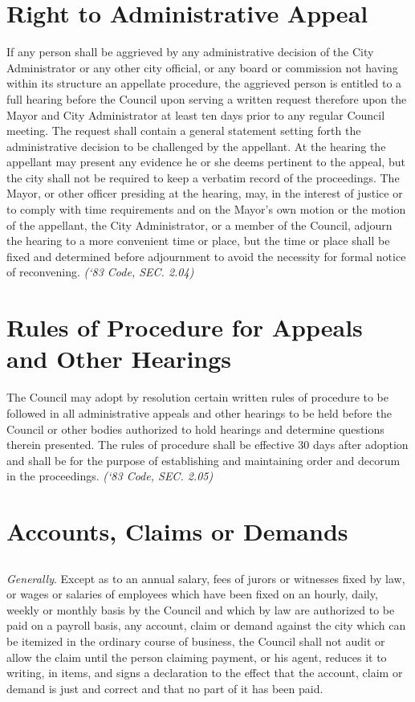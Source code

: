 \section{Right to Administrative Appeal}
If any person shall be aggrieved by any administrative decision of the City Administrator or any other city official, or any board or commission not having within its structure an appellate procedure, the aggrieved person is entitled to a full hearing before the Council upon serving a written request therefore upon the Mayor and City Administrator at least ten days prior to any regular Council meeting. The request shall contain a general statement setting forth the administrative decision to be challenged by the appellant. At the hearing the appellant may present any evidence he or she deems pertinent to the appeal, but the city shall not be required to keep a verbatim record of the proceedings. The Mayor, or other officer presiding at the hearing, may, in the interest of justice or to comply with time requirements and on the Mayor’s own motion or the motion of the appellant, the City Administrator, or a member of the Council, adjourn the hearing to a more convenient time or place, but the time or place shall be fixed and determined before adjournment to avoid the necessity for formal notice of reconvening.\newline
\emph{(‘83 Code, SEC. 2.04)}



\section{Rules of Procedure for Appeals and Other Hearings}
The Council may adopt by resolution certain written rules of procedure to be followed in all administrative appeals and other hearings to be held before the Council or other bodies authorized to hold hearings and determine questions therein presented.  The rules of procedure shall be effective 30 days after adoption and shall be for the purpose of establishing and maintaining order and decorum in the proceedings.\newline
\emph{(‘83 Code, SEC. 2.05)}



\section{Accounts, Claims or Demands}
\subsection{}
\emph{Generally}. Except as to an annual salary, fees of jurors or witnesses fixed by law, or wages or salaries of employees which have been fixed on an hourly, daily, weekly or monthly basis by the Council and which by law are authorized to be paid on a payroll basis, any account, claim or demand against the city which can be itemized in the ordinary course of business, the Council shall not audit or allow the claim until the person claiming payment, or his agent, reduces it to writing, in items, and signs a declaration to the effect that the account, claim or demand is just and correct and that no part of it has been paid.
